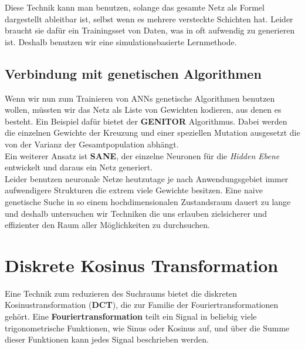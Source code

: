             \noindent
            Diese Technik kann man benutzen, solange das gesamte Netz als Formel dargestellt ableitbar ist, selbst wenn es mehrere versteckte Schichten hat. Leider braucht sie dafür ein Trainingsset von Daten, was in oft aufwendig zu generieren ist. Deshalb benutzen wir eine simulationsbasierte Lernmethode.

        \subsection{Verbindung mit genetischen Algorithmen}
            Wenn wir nun zum Trainieren von ANNs genetische Algorithmen benutzen wollen, müssten wir das Netz als Liste von Gewichten kodieren, aus denen es besteht. Ein Beispiel dafür bietet der \textbf{GENITOR}\cite{moriarty1999evolutionary} Algorithmus. Dabei werden die einzelnen Gewichte der Kreuzung und einer speziellen Mutation ausgesetzt die von der Varianz der Gesamtpopulation abhängt. \\

            \noindent
            Ein weiterer Ansatz ist \textbf{SANE}\cite{moriarty1999evolutionary}, der einzelne Neuronen für die \textit{Hidden Ebene} entwickelt und daraus ein Netz generiert. \\ %

            \noindent
            Leider benutzen neuronale Netze heutzutage je nach Anwendungsgebiet immer aufwendigere Strukturen die extrem viele Gewichte besitzen. Eine naive genetische Suche in so einem hochdimensionalen Zustandsraum dauert zu lange und deshalb untersuchen wir Techniken die uns erlauben zielsicherer und effizienter den Raum aller Möglichkeiten zu durchsuchen. 


    \section{Diskrete Kosinus Transformation} \label{dct-definition}
        Eine Technik zum reduzieren des Suchraums bietet die diskreten Kosinustransformation (\textbf{DCT}), die zur Familie der Fouriertransformationen gehört. Eine \textbf{Fouriertransformation} teilt ein Signal in beliebig viele trigonometrische Funktionen, wie Sinus oder Kosinus auf, und über die Summe dieser Funktionen kann jedes Signal beschrieben werden. \\

